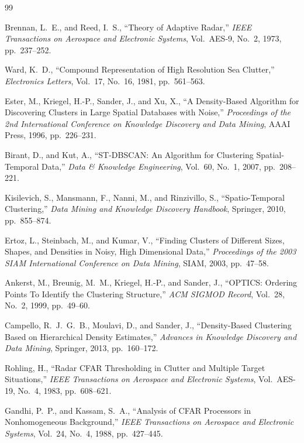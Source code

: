 \documentclass[conf]{new-aiaa}
\begin{document}
\newpage
\begin{thebibliography}{99}

Brennan, L.~E., and Reed, I.~S., ``Theory of Adaptive Radar,'' \textit{IEEE Transactions on Aerospace and Electronic Systems}, Vol.~AES-9, No.~2, 1973, pp.~237--252.

Ward, K.~D., ``Compound Representation of High Resolution Sea Clutter,'' \textit{Electronics Letters}, Vol.~17, No.~16, 1981, pp.~561--563.

Ester, M., Kriegel, H.-P., Sander, J., and Xu, X., ``A Density-Based Algorithm for Discovering Clusters in Large Spatial Databases with Noise,'' \textit{Proceedings of the 2nd International Conference on Knowledge Discovery and Data Mining}, AAAI Press, 1996, pp.~226--231.

Birant, D., and Kut, A., ``ST-DBSCAN: An Algorithm for Clustering Spatial-Temporal Data,'' \textit{Data \& Knowledge Engineering}, Vol.~60, No.~1, 2007, pp.~208--221.

Kisilevich, S., Mansmann, F., Nanni, M., and Rinzivillo, S., ``Spatio-Temporal Clustering,'' \textit{Data Mining and Knowledge Discovery Handbook}, Springer, 2010, pp.~855--874.

Ertoz, L., Steinbach, M., and Kumar, V., ``Finding Clusters of Different Sizes, Shapes, and Densities in Noisy, High Dimensional Data,'' \textit{Proceedings of the 2003 SIAM International Conference on Data Mining}, SIAM, 2003, pp.~47--58.

Ankerst, M., Breunig, M.~M., Kriegel, H.-P., and Sander, J., ``OPTICS: Ordering Points To Identify the Clustering Structure,'' \textit{ACM SIGMOD Record}, Vol.~28, No.~2, 1999, pp.~49--60.

Campello, R.~J.~G.~B., Moulavi, D., and Sander, J., ``Density-Based Clustering Based on Hierarchical Density Estimates,'' \textit{Advances in Knowledge Discovery and Data Mining}, Springer, 2013, pp.~160--172.

Rohling, H., ``Radar CFAR Thresholding in Clutter and Multiple Target Situations,'' \textit{IEEE Transactions on Aerospace and Electronic Systems}, Vol.~AES-19, No.~4, 1983, pp.~608--621.

Gandhi, P.~P., and Kassam, S.~A., ``Analysis of CFAR Processors in Nonhomogeneous Background,'' \textit{IEEE Transactions on Aerospace and Electronic Systems}, Vol.~24, No.~4, 1988, pp.~427--445.


\end{thebibliography}
\end{document}
